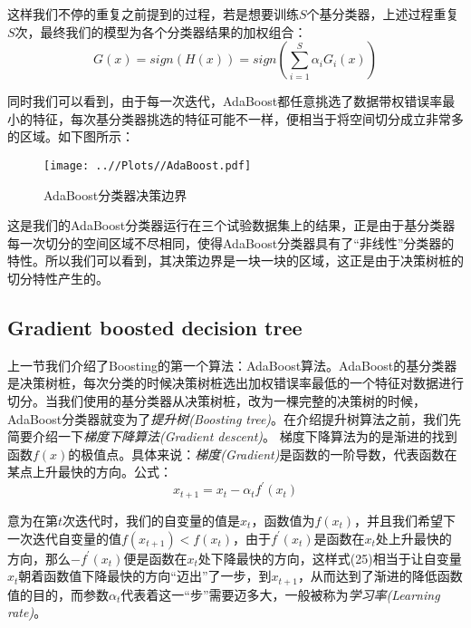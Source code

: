 \documentclass[UTF8, 12pt]{ctexart}
\begin{document}
这样我们不停的重复之前提到的过程，若是想要训练$S$个基分类器，上述过程重复$S$次，最终我们的模型为各个分类器结果的加权组合：
\begin{equation}
	G(x) = sign(H(x)) = sign(\sum_{i=1}^{S} \alpha_{i}G_{i}(x))
\end{equation}

同时我们可以看到，由于每一次迭代，AdaBoost都任意挑选了数据带权错误率最小的特征，每次基分类器挑选的特征可能不一样，便相当于将空间切分成立非常多的区域。如下图所示：
\begin{figure}[H]
	\centering
	\texttt{[image: ..//Plots//AdaBoost.pdf]}
	\caption{AdaBoost分类器决策边界}
	\label{Fig:9}
	\vspace{-0.5em}
\end{figure}

这是我们的AdaBoost分类器运行在三个试验数据集上的结果，正是由于基分类器每一次切分的空间区域不尽相同，使得AdaBoost分类器具有了“非线性”分类器的特性。所以我们可以看到，其决策边界是一块一块的区域，这正是由于决策树桩的切分特性产生的。


\subsection{Gradient boosted decision tree}
上一节我们介绍了Boosting的第一个算法：AdaBoost算法。AdaBoost的基分类器是决策树桩，每次分类的时候决策树桩选出加权错误率最低的一个特征对数据进行切分。当我们使用的基分类器从决策树桩，改为一棵完整的决策树的时候，AdaBoost分类器就变为了\emph{提升树(Boosting tree)}。在介绍提升树算法之前，我们先简要介绍一下\emph{梯度下降算法(Gradient descent)}。
梯度下降算法为的是渐进的找到函数$f(x)$的极值点。具体来说：\emph{梯度(Gradient)}是函数的一阶导数，代表函数在某点上升最快的方向。公式：
\begin{equation}
	x_{t+1} = x_{t} - \alpha_{t} f^{'}(x_{t})
\end{equation}

意为在第$t$次迭代时，我们的自变量的值是$x_{t}$，函数值为$f(x_{t})$，并且我们希望下一次迭代自变量的值$f(x_{t+1})<f(x_{t})$，由于$f^{'}(x_{t})$是函数在$x_{t}$处上升最快的方向，那么$-f^{'}(x_{t})$便是函数在$x_{t}$处下降最快的方向，这样式(25)相当于让自变量$x_{t}$朝着函数值下降最快的方向“迈出”了一步，到$x_{t+1}$，从而达到了渐进的降低函数值的目的，而参数$\alpha_{t}$代表着这一“步”需要迈多大，一般被称为\emph{学习率(Learning rate)}。
\end{document}
